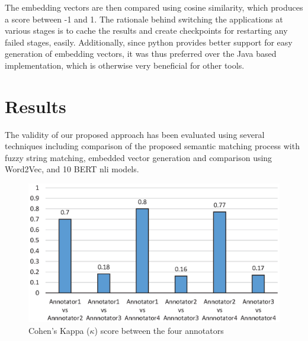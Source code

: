 \documentclass{ieeeaccess}
\begin{document}
The embedding vectors are then compared using cosine similarity, which produces a score between -1 and 1.
The rationale behind switching the applications at various stages is to cache the results and create checkpoints for restarting any failed stages, easily. Additionally, since python provides better support for easy generation of embedding vectors, it was thus preferred over the Java based implementation, which is otherwise very beneficial for other tools.

\section{Results}
\label{results}

The validity of our proposed approach has been evaluated using several techniques including comparison of the proposed semantic matching process with fuzzy string matching, embedded vector generation and comparison using Word2Vec, and 10 BERT nli models. 

\begin{figure}[htb!]
	\centering
	\includegraphics[width=\columnwidth]{kappaInterAnnotatorAgrement}
	\caption{Cohen's Kappa ($\kappa$) score between the four annotators}
	\label{fig:kappaInterAnnotatorAgrement}
\end{figure}
\end{document}
